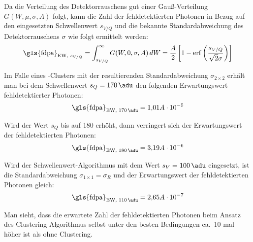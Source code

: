 \noindent
Da die Verteilung des Detektorrauschens gut einer Gauß-Verteilung $G(W, \mu, \sigma, A)$ folgt, kann die Zahl der fehldetektierten Photonen in Bezug auf den eingesetzten Schwellenwert $s_{V/Q}$ und die bekannte Standardabweichung des Detektorrauschens $\sigma$ wie folgt ermittelt werden: 
\begin{equation}
    \text{\gls{fdpa}}_{\text{EW, $s_{V/Q}$}}=\int_{s_{V/Q}}^\infty G(W, 0, \sigma, A) \,dW = \frac{A}{2}\left[1 - \erf\left({\frac{s_{V/Q}}{\sqrt{2}\sigma}}\right)\right]
\end{equation}

\noindent
Im Falle eines -Clusters mit der resultierenden Standardabweichung $\sigma_{2\times 2}$ erhält man bei dem Schwellenwert $s_Q = \SI{170}{\adu}$ den folgenden Erwartungswert fehldetektierter Photonen:
\begin{equation}
     \text{\gls{fdpa}}_{\text{EW, \SI{170}{\adu}}} = 1{,}01A\cdot 10^{-5} %
\end{equation}

\noindent
Wird der Wert $s_Q$ bis auf \SI{180}{\adu} erhöht, dann verringert sich der Erwartungswert der fehldetektierten Photonen:
\begin{equation}
    \text{\gls{fdpa}}_{\text{EW, \SI{180}{\adu}}} = 3{,}19A\cdot 10^{-6} %
\end{equation}

\noindent
Wird der Schwellenwert-Algorithmus mit dem Wert $s_V = \SI{100}{\adu}$ eingesetzt, ist die Standardabweichung $\sigma_{1\times 1} = \sigma_{R}$ und der Erwartungswert der fehldetektierten Photonen gleich:
\begin{equation}
   \text{\gls{fdpa}}_{\text{EW, \SI{110}{\adu}}} = 2{,}65A\cdot 10^{-7} %
\end{equation}

\noindent
Man sieht, dass die erwartete Zahl der fehldetektierten Photonen beim Ansatz des Clustering-Al\-go\-rith\-mus selbst unter den besten Bedingungen ca.\ 10 mal höher ist als ohne Clustering.

